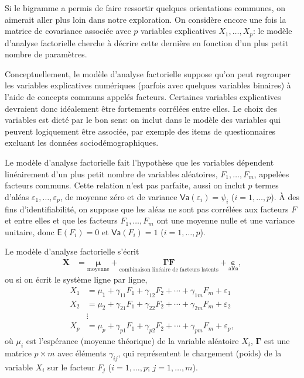 \documentclass[
  11pt,
  letterpaper,
]{scrbook}
\theoremstyle{definition}
\theoremstyle{remark}
\begin{document}
Si le bigramme a permis de faire ressortir quelques orientations
communes, on aimerait aller plus loin dans notre exploration. On
considère encore une fois la matrice de covariance associée avec \(p\)
variables explicatives \(X_1, \ldots, X_p\): le modèle d'analyse
factorielle cherche à décrire cette dernière en fonction d'un plus petit
nombre de paramètres.

Conceptuellement, le modèle d'analyse factorielle suppose qu'on peut
regrouper les variables explicatives numériques (parfois avec quelques
variables binaires) à l'aide de concepts communs appelés facteurs.
Certaines variables explicatives devraient donc idéalement être
fortements corrélées entre elles. Le choix des variables est dicté par
le bon sens: on inclut dans le modèle des variables qui peuvent
logiquement être associée, par exemple des items de questionnaires
excluant les données sociodémographiques.

Le modèle d'analyse factorielle fait l'hypothèse que les variables
dépendent linéairement d'un plus petit nombre de variables aléatoires,
\(F_1, \ldots, F_m\), appelées facteurs communs. Cette relation n'est
pas parfaite, aussi on inclut \(p\) termes d'aléas
\(\varepsilon_1, \ldots, \varepsilon_p\), de moyenne zéro et de variance
\(\mathsf{Va}(\varepsilon_i)=\psi_i\) (\(i=1, \ldots, p\)). À des fins
d'identifiabilité, on suppose que les aléas ne sont pas corrélées aux
facteurs \(F\) et entre elles et que les facteurs \(F_1, \ldots, F_m\)
ont une moyenne nulle et une variance unitaire, donc
\(\mathsf{E}(F_i)=0\) et \(\mathsf{Va}(F_i)=1\) (\(i=1, \ldots, p\)).

Le modèle d'analyse factorielle s'écrit \begin{align*}
\boldsymbol{X} &= \underset{\text{moyenne}}{\boldsymbol{\mu}} + \underset{\text{combinaison linéaire de facteurs latents}}{\boldsymbol{\Gamma}\boldsymbol{F}} + \underset{\text{aléa}}{\boldsymbol{\varepsilon}},
\end{align*} ou si on écrit le système ligne par ligne, \begin{align*}
X_1 &= \mu_1 + \gamma_{11}F_1 + \gamma_{12} F_2 + \cdots + \gamma_{1m}F_m + \varepsilon_1\\
X_2 &= \mu_2 + \gamma_{21}F_1 + \gamma_{22} F_2 + \cdots + \gamma_{2m}F_m + \varepsilon_2\\
&\vdots \\
X_p &= \mu_p + \gamma_{p1}F_1 + \gamma_{p2} F_2 + \cdots + \gamma_{pm}F_m + \varepsilon_p, 
\end{align*} où \(\mu_i\) est l'espérance (moyenne théorique) de la
variable aléatoire \(X_i\), \(\boldsymbol{\Gamma}\) est une matrice
\(p \times m\) avec éléments \(\gamma_{ij}\), qui représentent le
chargement (poids) de la variable \(X_i\) sur le facteur \(F_j\)
(\(i=1, \ldots, p\); \(j=1, \ldots, m\)).
\end{document}
